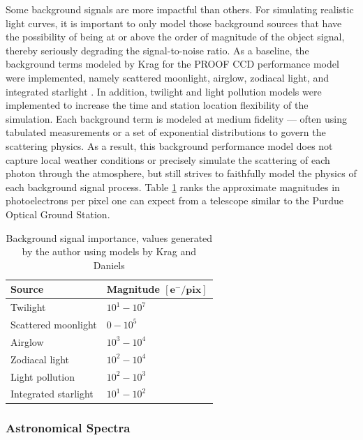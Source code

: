 Some background signals are more impactful than others. For simulating realistic light curves, it is important to only model those background sources that have the possibility of being at or above the order of magnitude of the object signal, thereby seriously degrading the signal-to-noise ratio. As a baseline, the background terms modeled by Krag for the PROOF CCD performance model were implemented, namely scattered moonlight, airglow, zodiacal light, and integrated starlight \cite{krag2003}. In addition, twilight and light pollution models were implemented to increase the time and station location flexibility of the simulation. Each background term is modeled at medium fidelity --- often using tabulated measurements or a set of exponential distributions to govern the scattering physics. As a result, this background performance model does not capture local weather conditions or precisely simulate the scattering of each photon through the atmosphere, but still strives to faithfully model the physics of each background signal process. Table \ref{tb:signal_importance} ranks the approximate magnitudes in photoelectrons per pixel one can expect from a telescope similar to the Purdue Optical Ground Station.

\begin{table}[]
  \centering
  \begin{tabular}{|l|l|}
  \hline
  \textbf{Source} & \textbf{Magnitude} $\mathbf{\left[ e^- / \textbf{pix}\right]}$ \\ \hline
  Twilight               & $10^1 - 10^7$                              \\ \hline
  Scattered moonlight    & $0 - 10^5$                                 \\ \hline
  Airglow                & $10^3 - 10^4$                              \\ \hline
  Zodiacal light         & $10^2 - 10^4$                              \\ \hline
  Light pollution        & $10^2 - 10^3$                              \\ \hline
  Integrated starlight   & $10^1 - 10^2$                              \\ \hline
  \end{tabular}
  \caption{Background signal importance, values generated by the author using models by Krag and Daniels \cite{krag2003, daniels1977}}
  \label{tb:signal_importance}
\end{table}

\subsubsection{Astronomical Spectra}

